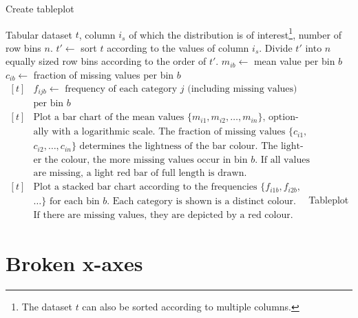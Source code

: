\documentclass[11pt, fleqn, a4paper]{article}\usepackage{graphicx, color}
\begin{document}
\begin{algorithm}[h]
\caption{Create tableplot}\label{alg}
\begin{minipage}{0.8\textwidth}
\begin{algorithmic}[1]
\Require Tabular dataset $t$, column $i_s$ of which the distribution is of interest\footnote{The dataset $t$ can also be sorted according to multiple columns.}, number of row bins $n$.
\State $t'\leftarrow$ sort $t$ according to the values of column $i_s$.
\State Divide $t'$ into $n$ equally sized row bins according to the order of $t'$.
\State $m_{ib}\leftarrow$ mean value per bin $b$
\State $c_{ib}\leftarrow$ fraction of missing values per bin $b$
\EndIf
{}
\State $\begin{aligned}[t]
		&\mbox{$f_{ijb}\leftarrow$ frequency of each category $j$ (including missing values)}\\[-3pt]
		&\mbox{per bin $b$}
	\end{aligned}$
\EndIf
\EndFor
{}
\State $\begin{aligned}[t]
		&\mbox{Plot a bar chart of the mean values $\{m_{i1}, m_{i2},\ldots, m_{in}\}$, option-}\\[-3pt]
		&\mbox{ally with a logarithmic scale. The fraction of missing values $\{c_{i1},$}\\[-3pt]
		&\mbox{$c_{i2},\ldots, c_{in}\}$ determines the lightness of the bar colour. The light-}\\[-3pt]
		&\mbox{er the colour, the more missing values occur in bin $b$. If all values}\\[-3pt]
		&\mbox{are missing, a light red bar of full length is drawn.}
	\end{aligned}$
\EndIf
{}
\State $\begin{aligned}[t]
		&\mbox{Plot a stacked bar chart according to the frequencies $\{f_{i1b}, f_{i2b},$}\\[-3pt]
		&\mbox{$\ldots\}$ for each bin $b$. Each category is shown is a distinct colour.}\\[-3pt]
		&\mbox{If there are missing values, they are depicted by a red colour.}
	\end{aligned}$
\EndIf
\EndFor
\Ensure Tableplot
\end{algorithmic}
\end{minipage}
\end{algorithm}

\newpage
\section{Broken x-axes}\label{secbrokenx}
\end{document}
